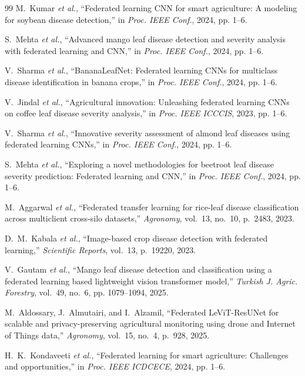 \documentclass[10pt,journal,compsoc]{IEEEtran}
\begin{document}
\begin{thebibliography}{99}
M.~Kumar \textit{et al.}, ``Federated learning CNN for smart agriculture: A modeling for soybean disease detection,'' in \textit{Proc. IEEE Conf.}, 2024, pp. 1--6.

S.~Mehta \textit{et al.}, ``Advanced mango leaf disease detection and severity analysis with federated learning and CNN,'' in \textit{Proc. IEEE Conf.}, 2024, pp. 1--6.

V.~Sharma \textit{et al.}, ``BananaLeafNet: Federated learning CNNs for multiclass disease identification in banana crops,'' in \textit{Proc. IEEE Conf.}, 2024, pp. 1--6.

V.~Jindal \textit{et al.}, ``Agricultural innovation: Unleashing federated learning CNNs on coffee leaf disease severity analysis,'' in \textit{Proc. IEEE ICCCIS}, 2023, pp. 1--6.

V.~Sharma \textit{et al.}, ``Innovative severity assessment of almond leaf diseases using federated learning CNNs,'' in \textit{Proc. IEEE Conf.}, 2024, pp. 1--6.

S.~Mehta \textit{et al.}, ``Exploring a novel methodologies for beetroot leaf disease severity prediction: Federated learning and CNN,'' in \textit{Proc. IEEE Conf.}, 2024, pp. 1--6.

M.~Aggarwal \textit{et al.}, ``Federated transfer learning for rice-leaf disease classification across multiclient cross-silo datasets,'' \textit{Agronomy}, vol.~13, no.~10, p.~2483, 2023.

D.~M.~Kabala \textit{et al.}, ``Image-based crop disease detection with federated learning,'' \textit{Scientific Reports}, vol.~13, p.~19220, 2023.

V.~Gautam \textit{et al.}, ``Mango leaf disease detection and classification using a federated learning based lightweight vision transformer model,'' \textit{Turkish J. Agric. Forestry}, vol.~49, no.~6, pp. 1079--1094, 2025.

M.~Aldossary, J.~Almutairi, and I.~Alzamil, ``Federated LeViT-ResUNet for scalable and privacy-preserving agricultural monitoring using drone and Internet of Things data,'' \textit{Agronomy}, vol.~15, no.~4, p.~928, 2025.

H.~K.~Kondaveeti \textit{et al.}, ``Federated learning for smart agriculture: Challenges and opportunities,'' in \textit{Proc. IEEE ICDCECE}, 2024, pp. 1--6.


\end{thebibliography}
\end{document}
